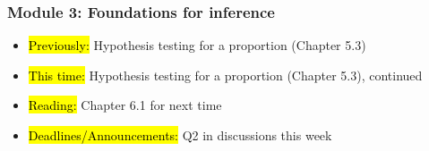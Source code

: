 
\begin{frame}
    \frametitle{Module 3: Foundations for inference}
    \begin{itemize}
        \item \hl{Previously: }Hypothesis testing for a proportion (Chapter 5.3)
        \item \hl{This time: }Hypothesis testing for a proportion (Chapter 5.3), continued
        \item \hl{Reading: }Chapter 6.1 for next time
        \item \hl{Deadlines/Announcements: }Q2 in discussions this week
    \end{itemize}
    
\end{frame}